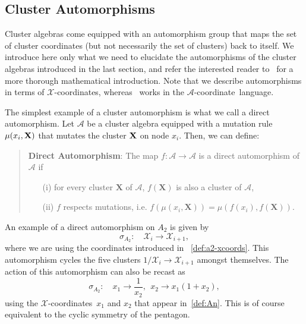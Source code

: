 \documentclass[12pt]{article}
\def\x{\mathcal{X}}
\def\xcoords{$\mathcal{X}$-coordinates}
\def\a{\mathcal{A}}
\def\acoord{$\mathcal{A}$-coordinate}
\begin{document}

\subsection{Cluster Automorphisms}\label{sec:automorphisms}

Cluster algebras come equipped with an automorphism group that maps the set of cluster coordinates (but not necessarily the set of clusters) back to itself. We introduce here only what we need to elucidate the automorphisms of the cluster algebras introduced in the last section, and refer the interested reader to~\cite{Chang:2015} for a more thorough mathematical introduction. Note that we describe automorphisms in terms of \xcoords, whereas~\cite{Chang:2015} works in the \acoord\ language. 

The simplest example of a cluster automorphism is what we call a direct automorphism. Let $\a$ be a cluster algebra equipped with a mutation rule $\mu(x_i, \bf{X})$ that mutates the cluster $\bf{X}$ on node $x_i$. Then, we can define:
\begin{quote}
{\bf Direct Automorphism}: The map $f: \a \to \a$ is a direct automorphism of $\a$ if 
\vspace{-.2cm}
 \begin{itemize}
 \item[(i)] for every cluster $\mathbf{X}$ of $\a$, $f(\mathbf{X})$ is also a cluster of $\a$, 
 \item[(ii)] $f$ respects mutations, i.e. $f(\mu(x_i,\mathbf{X})) = \mu(f(x_i),f(\mathbf{X}))$.
 \end{itemize}
\end{quote}
An example of a direct automorphism on $A_2$ is given by
\begin{equation}
  \sigma_{A_2}:\quad \mathcal{X}_i \to \mathcal{X}_{i+1},
\end{equation}
where we are using the coordinates introduced in ~\eqref{def:a2-xcoords}. This automorphism cycles the five clusters $1/\x_i\to \x_{i+1}$ amongst themselves. The action of this automorphism can also be recast as
\begin{equation}
  \sigma_{A_2}:\quad x_1\to \frac{1}{x_2},~~ x_2\to x_1(1+x_2),
\end{equation}
using the \xcoords\ $x_1$ and $x_2$ that appear in~\eqref{def:An}. This is of course equivalent to the cyclic symmetry of the pentagon. 
\end{document}
